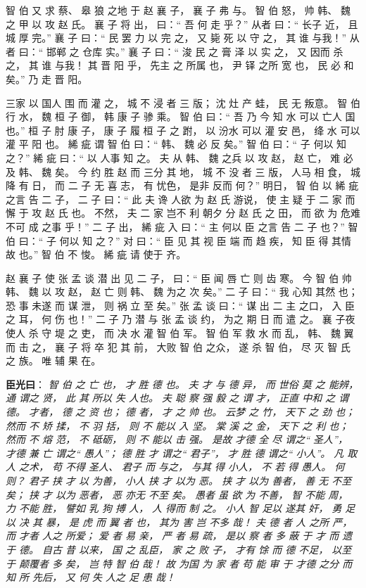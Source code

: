 \documentclass[UTF8,a4paper,8pt]{ctexbook}
\begin{document}
				  智 伯 又 求 蔡、 皋 狼 之地 于 赵 襄 子， 襄 子 弗 与。 智 伯 怒， 帅 韩、 魏 之 甲 以 攻 赵 氏。 襄 子 将 出， 曰：“ 吾 何 走 乎？” 从者 曰：“ 长子 近， 且 城 厚 完。” 襄 子 曰：“ 民 罢 力 以 完 之， 又 毙 死 以 守 之， 其 谁 与我！” 从者 曰：“ 邯郸 之 仓库 实。” 襄 子 曰：“ 浚 民 之 膏 泽 以 实 之， 又 因而 杀 之， 其 谁 与我！ 其 晋 阳 乎， 先主 之 所属 也， 尹 铎 之所 宽 也， 民 必 和 矣。” 乃 走 晋 阳。 
				  
				  三家 以 国人 围 而 灌 之， 城 不 浸 者 三 版； 沈 灶 产 蛙， 民 无 叛意。 智 伯 行 水， 魏 桓 子 御， 韩 康 子 骖 乘。 智 伯 曰：“ 吾 乃 今 知 水 可以 亡人 国 也。” 桓 子 肘 康 子， 康 子 履 桓 子 之 跗， 以 汾水 可以 灌 安 邑， 绛 水 可以 灌 平 阳 也。 絺 疵 谓 智 伯 曰：“ 韩、 魏 必 反 矣。” 智 伯 曰：“ 子 何以 知 之？” 絺 疵 曰：“ 以 人事 知 之。 夫 从 韩、 魏 之兵 以 攻 赵， 赵 亡， 难 必 及 韩、 魏 矣。 今 约 胜 赵 而 三分 其 地， 城 不 没 者 三 版， 人马 相 食， 城 降 有 日， 而 二 子 无 喜 志， 有 忧色， 是非 反而 何？” 明日， 智 伯 以 絺 疵 之言 告 二 子， 二 子 曰：“ 此 夫 谗 人欲 为 赵 氏 游说， 使 主 疑 于 二 家 而 懈 于 攻 赵 氏 也。 不然， 夫 二 家 岂不 利 朝夕 分 赵 氏 之 田， 而 欲 为 危难 不可 成 之事 乎！” 二 子 出， 絺 疵 入 曰：“ 主 何以 臣 之言 告 二 子 也？” 智 伯 曰：“ 子 何以 知 之？” 对 曰：“ 臣 见 其 视 臣 端 而 趋 疾， 知 臣 得 其情 故 也。” 智 伯 不 悛。 絺 疵 请 使于 齐。
				  
				  赵 襄 子 使 张 孟 谈 潜 出 见 二 子， 曰：“ 臣 闻 唇 亡 则 齿 寒。 今 智 伯 帅 韩、 魏 以 攻 赵， 赵 亡 则 韩、 魏 为之 次 矣。” 二 子 曰：“ 我 心知 其然 也； 恐 事 未遂 而 谋 泄， 则 祸 立 至 矣。” 张 孟 谈 曰：“ 谋 出 二 主 之口， 入 臣 之 耳， 何 伤 也！” 二 子 乃 潜 与 张 孟 谈 约， 为之 期 日 而 遣 之。 襄 子夜 使人 杀 守 堤 之 吏， 而 决 水 灌 智 伯 军。 智 伯 军 救 水 而 乱， 韩、 魏 翼 而 击 之， 襄 子 将 卒 犯 其 前， 大败 智 伯 之众， 遂 杀 智 伯， 尽 灭 智 氏 之 族。 唯 辅 果 在。 
				  
				  \textbf{臣光曰}： \textit{智 伯 之 亡 也， 才 胜 德 也。 夫 才 与 德 异， 而 世俗 莫 之 能辨， 通 谓之 贤， 此 其 所以 失 人也。 夫 聪 察 强 毅 之 谓 才， 正直 中和 之 谓 德。 才者， 德 之 资 也； 德 者， 才 之 帅 也。 云梦 之 竹， 天下 之 劲 也； 然而 不 矫 揉， 不 羽 括， 则 不 能以 入 坚。 棠 溪 之 金， 天下 之 利 也； 然而 不 熔 范， 不 砥砺， 则 不 能以 击 强。 是故 才德 全 尽 谓之“ 圣人”， 才德 兼 亡 谓之“ 愚人”； 德 胜 才 谓之“ 君子”， 才 胜 德 谓之“ 小人”。 凡 取 人 之术， 苟 不得 圣人、 君子 而 与之， 与其 得 小人， 不 若 得 愚人。 何 则？ 君子 挟 才 以 为善， 小人 挟 才 以为 恶。 挟 才 以为 善者， 善 无 不至 矣； 挟 才 以为 恶者， 恶 亦无 不至 矣。 愚者 虽 欲 为 不善， 智 不能 周， 力 不能 胜， 譬如 乳 狗 搏 人， 人 得而 制 之。 小人 智 足以 遂其 奸， 勇 足以 决 其 暴， 是 虎 而 翼 者 也， 其为 害 岂 不多 哉！ 夫 德 者 人 之所 严， 而 才者 人之 所爱； 爱 者 易 亲， 严 者 易 疏， 是以 察 者 多 蔽 于 才 而 遗 于 德。 自古 昔 以来， 国 之 乱臣， 家 之 败 子， 才有 馀 而 德 不足， 以至于 颠覆者 多 矣， 岂 特 智 伯 哉！ 故 为国 为 家 者 苟 能 审 于 才德 之分 而知 所 先后， 又 何 失 人之 足 患 哉！}
				  
\end{document}
